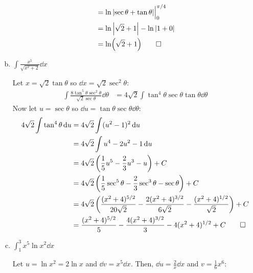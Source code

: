 \documentclass{agony}
\begin{document}
\begin{enumerate}[(a)]
\begin{sol}
\begin{align*}
             & = \ln\abs{\sec\theta+\tan\theta}\Big|_0^{\pi/4} \\
             & = \ln\abs{\sqrt{2} + 1} - \ln\abs{1 + 0}        \\
             & = \ln(\sqrt{2} + 1) \qedhere
          \end{align*}
        \end{sol}
  \item $\displaystyle\int \frac{x^5}{\sqrt{x^2 + 2}} \dd{x}$
        \begin{sol}
          Let $x = \sqrt{2}\tan\theta$ so $\dd{x} = \sqrt{2}\sec^2\theta$:
          \begin{align*}
            \int \frac{8\tan^5\theta\sec^2\theta}{\sqrt{2}\sec\theta} \dd{\theta}
             & = 4\sqrt{2}\int \tan^4\theta\sec\theta\tan\theta\dd{\theta}
          \end{align*}
          Now let $u = \sec\theta$ so $\dd{u} = \tan\theta\sec\theta\dd{\theta}$:
          \begin{align*}
            4\sqrt{2} \int \tan^4\theta \dd{u}
             & = 4\sqrt{2} \int (u^2 - 1)^2 \dd{u}                                                                                                 \\
             & = 4\sqrt{2} \int u^4 - 2u^2 - 1 \dd{u}                                                                                              \\
             & = 4\sqrt{2} \left( \frac{1}{5}u^5 - \frac{2}{3}u^3 - u \right) + C                                                                  \\
             & = 4\sqrt{2} \left( \frac{1}{5}\sec^5\theta - \frac{2}{3}\sec^3\theta - \sec\theta \right) + C                                       \\
             & = 4\sqrt{2} \left( \frac{(x^2+4)^{5/2}}{20\sqrt{2}} - \frac{2(x^2+4)^{3/2}}{6\sqrt{2}} - \frac{(x^2+4)^{1/2}}{\sqrt{2}} \right) + C \\
             & = \frac{(x^2+4)^{5/2}}{5} - \frac{4(x^2+4)^{3/2}}{3} - 4(x^2+4)^{1/2} + C \qedhere
          \end{align*}
        \end{sol}
  \item $\displaystyle\int_1^3 x^5 \ln x^2 \dd{x}$
        \begin{sol}
          Let $u = \ln x^2 = 2\ln x$ and $\dd{v} = x^5 \dd{x}$.
          Then, $\dd{u} = \frac{2}{x} \dd{x}$ and $v = \frac{1}{6}x^6$:
          \begin{align*}

\end{align*}
\end{sol}
\end{enumerate}
\end{document}
